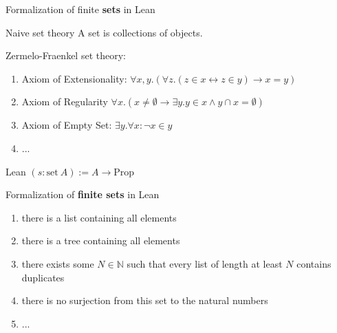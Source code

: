 \documentclass{beamer}
\begin{document}
    \begin{frame}{Formalization of finite \textbf{sets} in Lean}
        \begin{block}{Naive set theory}
            A set is collections of objects.
        \end{block}
        \begin{block}{Zermelo-Fraenkel set theory:}
        \begin{enumerate}
            \item Axiom of Extensionality:
            $\forall x, y.(\forall z. (z \in x \leftrightarrow z \in y) \rightarrow x=y)$
            
            \item Axiom of Regularity 
            $\forall x. (x \neq \emptyset \rightarrow \exists y. y \in x \land y \cap x = \emptyset ) $
            
            \item Axiom of Empty Set: $\exists y. \forall x: \neg x \in y$
            \item ...
            
        \end{enumerate}
        \end{block}
        \pause
        \begin{block}{Lean}
        $(s: \text{{set}}\ A) := A \to \text{{Prop}}$
        \end{block}
    \end{frame}
    \begin{frame}{Formalization of \textbf{finite sets} in Lean}
        \begin{enumerate}[<+->]
            \item there is a list containing all elements
            \item there is a tree containing all elements
            \item there exists some $N \in \mathbb{N}$ such that every list of length at least $N$ contains duplicates
            \item there is no surjection from this set to the natural numbers
            \item ...
        \end{enumerate}
    \end{frame}
\end{document}
